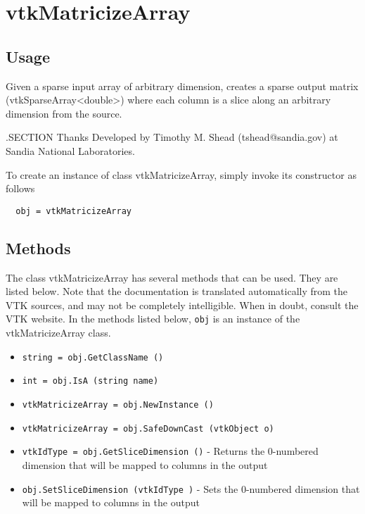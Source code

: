 \section{vtkMatricizeArray}

\subsection{Usage}

 Given a sparse input array of arbitrary dimension, creates a sparse output
 matrix (vtkSparseArray<double>) where each column is a slice along an
 arbitrary dimension from the source.

 .SECTION Thanks
 Developed by Timothy M. Shead (tshead@sandia.gov) at Sandia National Laboratories.

To create an instance of class vtkMatricizeArray, simply
invoke its constructor as follows
\begin{verbatim}
  obj = vtkMatricizeArray
\end{verbatim}
\subsection{Methods}

The class vtkMatricizeArray has several methods that can be used.
  They are listed below.
Note that the documentation is translated automatically from the VTK sources,
and may not be completely intelligible.  When in doubt, consult the VTK website.
In the methods listed below, \verb|obj| is an instance of the vtkMatricizeArray class.
\begin{itemize}
\item  \verb|string = obj.GetClassName ()|

\item  \verb|int = obj.IsA (string name)|

\item  \verb|vtkMatricizeArray = obj.NewInstance ()|

\item  \verb|vtkMatricizeArray = obj.SafeDownCast (vtkObject o)|

\item  \verb|vtkIdType = obj.GetSliceDimension ()| -  Returns the 0-numbered dimension that will be mapped to columns in the output

\item  \verb|obj.SetSliceDimension (vtkIdType )| -  Sets the 0-numbered dimension that will be mapped to columns in the output

\end{itemize}

